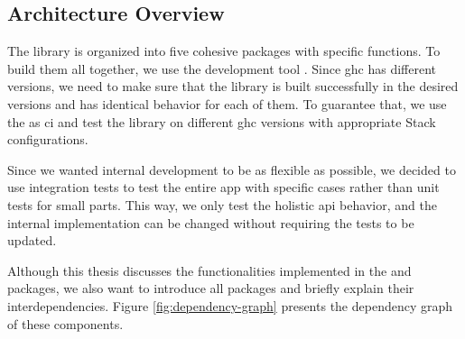 \subsection{Architecture Overview}
\label{sec:arc}

The library is organized into five cohesive packages with specific functions. To build them all together, we use the development tool \Stack{}. Since \gls{ghc} has different versions, we need to make sure that the library is built successfully in the desired versions and has identical behavior for each of them. To guarantee that, we use the \GithubActions{} as \gls{ci} and test the library on different \gls{ghc} versions with appropriate Stack configurations.

Since we wanted internal development to be as flexible as possible, we decided to use integration tests to test the entire app with specific cases rather than unit tests for small parts. This way, we only test the holistic \gls{api} behavior, and the internal implementation can be changed without requiring the tests to be updated.

Although this thesis discusses the functionalities implemented in the \serverPackage and \appPackage packages, we also want to introduce all \Morpheus{} packages and briefly explain their interdependencies. Figure \ref{fig:dependency-graph} presents the dependency graph of these components.

